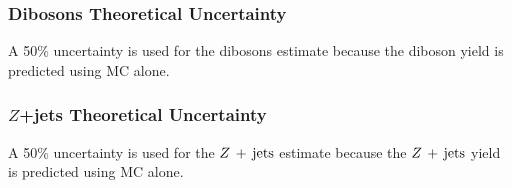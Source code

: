 \subsubsection*{Dibosons Theoretical Uncertainty}

A 50\% uncertainty is used for the dibosons estimate because the diboson yield is predicted using MC alone.

\subsubsection*{$Z$+jets Theoretical Uncertainty}

A 50\% uncertainty is used for the $Z\,+\,\mathrm{jets}$ estimate because the $Z\,+\,\mathrm{jets}$ yield is predicted using MC alone.


